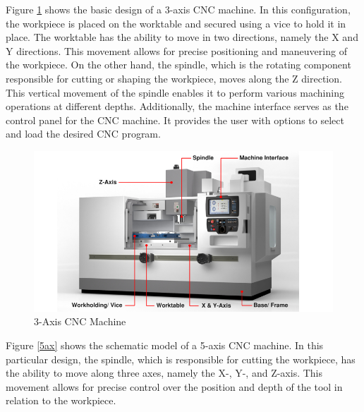 Figure \ref{3ax} shows the basic design of a 3-axis \acrshort{CNC} machine. In this configuration, the workpiece is placed on the worktable and secured using a vice to hold it in place. The worktable has the ability to move in two directions, namely the X and Y directions. This movement allows for precise positioning and maneuvering of the workpiece. On the other hand, the spindle, which is the rotating component responsible for cutting or shaping the workpiece, moves along the Z direction. This vertical movement of the spindle enables it to perform various machining operations at different depths. Additionally, the machine interface serves as the control panel for the \acrshort{CNC} machine. It provides the user with options to select and load the desired \acrshort{CNC} program. %




 
\begin{figure}[H]
	\centerline{\includegraphics[scale=.6]{figures/basicCNC.jpg}}
	\caption{3-Axis CNC Machine~\cite{3ax}}
	\label{3ax}
\end{figure}
\newpage


Figure \ref{5ax} shows the schematic model of a 5-axis \acrshort{CNC} machine. In this particular design, the spindle, which is responsible for cutting the workpiece, has the ability to move along three axes, namely the X-, Y-, and Z-axis. This movement allows for precise control over the position and depth of the tool in relation to the workpiece.

